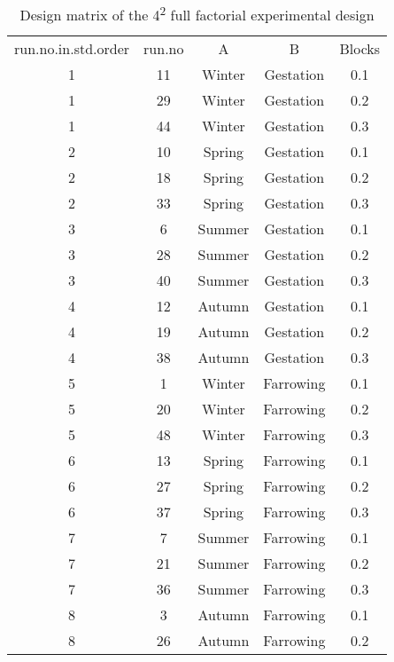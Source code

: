 \begin{table}[]
\centering
\caption{Design matrix of the 4\textsuperscript{2} full factorial experimental design}
\label{table5}
\begin{tabular}{ccccc}
run.no.in.std.order & run.no & A      & B         & Blocks \\
1                   & 11     & Winter & Gestation & 0.1    \\
1                   & 29     & Winter & Gestation & 0.2    \\
1                   & 44     & Winter & Gestation & 0.3    \\
2                   & 10     & Spring & Gestation & 0.1    \\
2                   & 18     & Spring & Gestation & 0.2    \\
2                   & 33     & Spring & Gestation & 0.3    \\
3                   & 6      & Summer & Gestation & 0.1    \\
3                   & 28     & Summer & Gestation & 0.2    \\
3                   & 40     & Summer & Gestation & 0.3    \\
4                   & 12     & Autumn & Gestation & 0.1    \\
4                   & 19     & Autumn & Gestation & 0.2    \\
4                   & 38     & Autumn & Gestation & 0.3    \\
5                   & 1      & Winter & Farrowing & 0.1    \\
5                   & 20     & Winter & Farrowing & 0.2    \\
5                   & 48     & Winter & Farrowing & 0.3    \\
6                   & 13     & Spring & Farrowing & 0.1    \\
6                   & 27     & Spring & Farrowing & 0.2    \\
6                   & 37     & Spring & Farrowing & 0.3    \\
7                   & 7      & Summer & Farrowing & 0.1    \\
7                   & 21     & Summer & Farrowing & 0.2    \\
7                   & 36     & Summer & Farrowing & 0.3    \\
8                   & 3      & Autumn & Farrowing & 0.1    \\
8                   & 26     & Autumn & Farrowing & 0.2    \\

\end{tabular}
\end{table}
